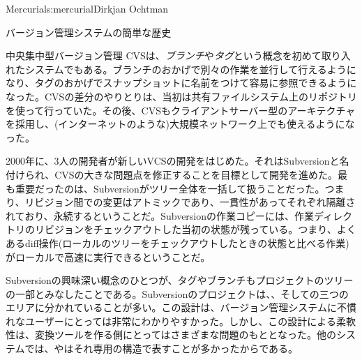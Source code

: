 \begin{aosachapter}{Mercurial}{s:mercurial}{Dirkjan Ochtman}
\begin{aosasect1}{バージョン管理システムの簡単な歴史}
\begin{aosasect2}{中央集中型バージョン管理}
CVSは、\emph{ブランチ}や\emph{タグ}という概念を初めて取り入れたシステムでもある。ブランチのおかげで別々の作業を並行して行えるようになり、タグのおかげでスナップショットに名前をつけて容易に参照できるようになった。CVSの差分のやりとりは、当初は共有ファイルシステム上のリポジトリを使って行っていた。その後、CVSもクライアントサーバー型のアーキテクチャを採用し、(インターネットのような)大規模ネットワーク上でも使えるようになった。

2000年に、3人の開発者が新しいVCSの開発をはじめた。それはSubversionと名付けられ、CVSの大きな問題点を修正することを目標として開発を進めた。最も重要だったのは、Subversionがツリー全体を一括して扱うことだった。つまり、リビジョン間での変更はアトミックであり、一貫性があってそれぞれ隔離されており、永続するということだ。Subversionの作業コピーには、作業ディレクトリのリビジョンをチェックアウトした当初の状態が残っている。つまり、よくあるdiff操作(ローカルのツリーをチェックアウトしたときの状態と比べる作業)がローカルで高速に実行できるということだ。

Subversionの興味深い概念のひとつが、タグやブランチもプロジェクトのツリーの一部とみなしたことである。Subversionのプロジェクトは、、そしての三つのエリアに分かれていることが多い。この設計は、バージョン管理システムに不慣れなユーザーにとっては非常にわかりやすかった。しかし、この設計による柔軟性は、変換ツールを作る側にとってはさまざまな問題のもととなった。他のシステムでは、やはそれ専用の構造で表すことが多かったからである。


\end{aosasect2}
\end{aosasect1}
\end{aosachapter}
